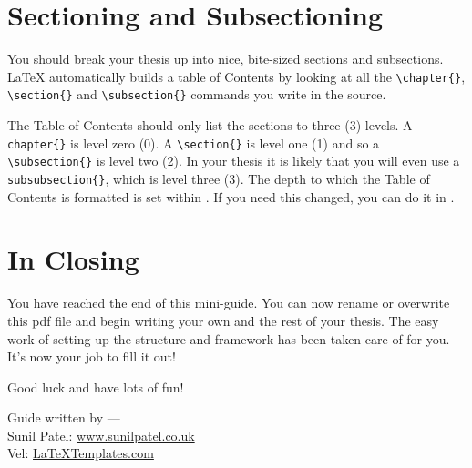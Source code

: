 
\section{Sectioning and Subsectioning}

You should break your thesis up into nice, bite-sized sections and subsections.
\LaTeX{} automatically builds a table of Contents by looking at all the \verb|\chapter{}|, \verb|\section{}|  and \verb|\subsection{}| commands you write in the source.

The Table of Contents should only list the sections to three (3) levels.
A \verb|chapter{}| is level zero (0).
A \verb|\section{}| is level one (1) and so a \verb|\subsection{}| is level two (2).
In your thesis it is likely that you will even use a \verb|subsubsection{}|, which is level three (3).
The depth to which the Table of Contents is formatted is set within .
If you need this changed, you can do it in .


\section{In Closing}

You have reached the end of this mini-guide.
You can now rename or overwrite this pdf file and begin writing your own  and the rest of your thesis.
The easy work of setting up the structure and framework has been taken care of for you.
It's now your job to fill it out!

Good luck and have lots of fun!

\begin{flushright}
Guide written by ---\\
Sunil Patel: \href{http://www.sunilpatel.co.uk}{www.sunilpatel.co.uk}\\
Vel: \href{http://www.LaTeXTemplates.com}{LaTeXTemplates.com}
\end{flushright}
